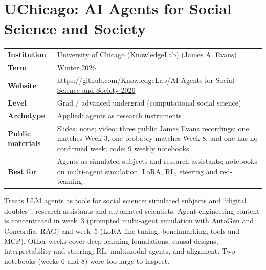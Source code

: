 \documentclass[10pt,oneside]{report}
\begin{document}
\chapter{UChicago: AI Agents for Social Science and Society}\hypertarget{course-UCHI}{}
{\small\begin{tabularx}{\linewidth}{@{}>{\bfseries}l X@{}}\toprule
Institution & University of Chicago (KnowledgeLab) (James A. Evans)\\
Term & Winter 2026\\
Website & \href{https://github.com/KnowledgeLab/AI-Agents-for-Social-Science-and-Society-2026}{https://github.com/KnowledgeLab/AI-Agents-for-Social-Science-and-Society-2026}\\
Level & Grad / advanced undergrad (computational social science)\\
Archetype & Applied: agents as research instruments\\
Public materials & Slides: none; video: three public James Evans recordings: one matches Week 3, one probably matches Week 8, and one has no confirmed week; code: 9 weekly notebooks\\
Best for & Agents as simulated subjects and research assistants; notebooks on multi-agent simulation, LoRA, RL, steering and red-teaming.\\
\bottomrule\end{tabularx}}

Treats LLM agents as tools for social science: simulated subjects and ``digital doubles'', research assistants and automated scientists.
Agent-engineering content is concentrated in week~3 (prompted multi-agent simulation with AutoGen and Concordia, RAG) and week~5 (LoRA fine-tuning, benchmarking, tools and MCP). Other weeks cover deep-learning foundations, causal designs, interpretability and steering, RL, multimodal agents, and alignment.
Two notebooks (weeks 6 and 8) were too large to inspect.
\end{document}

